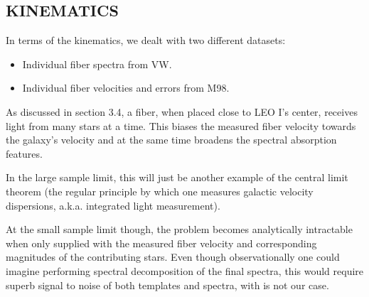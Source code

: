 \documentclass[%
 aip,
 twocolumn,
 jmp,%
 amsmath,amssymb,
 reprint,%
]{aastex61}
\begin{document}










\subsection{KINEMATICS}


In terms of the kinematics, we dealt with two different datasets:
\begin{itemize}
    \item Individual fiber spectra from VW.
    \item Individual fiber velocities and errors from M98.
\end{itemize}

As discussed in section 3.4, a fiber, when placed close to LEO I's center, receives  light from many stars at a time. This biases the measured fiber velocity towards the galaxy's velocity and at the same time broadens the spectral absorption features.

In the large sample limit, this will just be another example of the central limit theorem (the regular principle by which one measures galactic velocity dispersions, a.k.a. integrated light measurement).

At the small sample limit though, the problem becomes analytically intractable when only supplied with the measured fiber velocity and corresponding magnitudes of the contributing stars. Even though observationally one could imagine performing spectral decomposition of the final spectra, this would require superb signal to noise of both templates and spectra, with is not our case.
\end{document}
